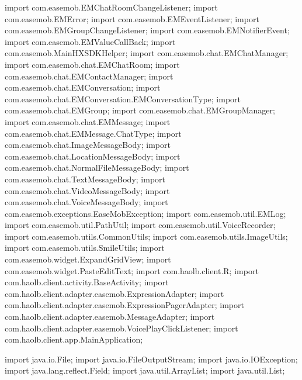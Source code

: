 import com.easemob.EMChatRoomChangeListener;
import com.easemob.EMError;
import com.easemob.EMEventListener;
import com.easemob.EMGroupChangeListener;
import com.easemob.EMNotifierEvent;
import com.easemob.EMValueCallBack;
import com.easemob.MainHXSDKHelper;
import com.easemob.chat.EMChatManager;
import com.easemob.chat.EMChatRoom;
import com.easemob.chat.EMContactManager;
import com.easemob.chat.EMConversation;
import com.easemob.chat.EMConversation.EMConversationType;
import com.easemob.chat.EMGroup;
import com.easemob.chat.EMGroupManager;
import com.easemob.chat.EMMessage;
import com.easemob.chat.EMMessage.ChatType;
import com.easemob.chat.ImageMessageBody;
import com.easemob.chat.LocationMessageBody;
import com.easemob.chat.NormalFileMessageBody;
import com.easemob.chat.TextMessageBody;
import com.easemob.chat.VideoMessageBody;
import com.easemob.chat.VoiceMessageBody;
import com.easemob.exceptions.EaseMobException;
import com.easemob.util.EMLog;
import com.easemob.util.PathUtil;
import com.easemob.util.VoiceRecorder;
import com.easemob.utils.CommonUtils;
import com.easemob.utils.ImageUtils;
import com.easemob.utils.SmileUtils;
import com.easemob.widget.ExpandGridView;
import com.easemob.widget.PasteEditText;
import com.haolb.client.R;
import com.haolb.client.activity.BaseActivity;
import com.haolb.client.adapter.easemob.ExpressionAdapter;
import com.haolb.client.adapter.easemob.ExpressionPagerAdapter;
import com.haolb.client.adapter.easemob.MessageAdapter;
import com.haolb.client.adapter.easemob.VoicePlayClickListener;
import com.haolb.client.app.MainApplication;

import java.io.File;
import java.io.FileOutputStream;
import java.io.IOException;
import java.lang.reflect.Field;
import java.util.ArrayList;
import java.util.List;

